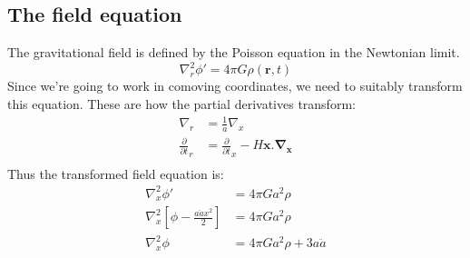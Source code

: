 \documentclass[12pt,a4paper,twoside]{book}
\begin{document}
		\subsection{The field equation}
			The gravitational field is defined by the Poisson equation in the Newtonian limit.
			\begin{equation}
			\nabla_r^2\phi'=4\pi G\rho(\mathbf{r},t)
			\end{equation}
			Since we're going to work in comoving coordinates, we need to suitably transform this equation. These are how the partial derivatives transform:
			\begin{equation}
				\begin{aligned}
					\nabla_r&=\frac{1}{a}\nabla_x\\
					\frac{\partial}{\partial t}_r&=\frac{\partial}{\partial t}_x-H\mathbf{x.\nabla_x}\\
				\end{aligned}
				\label{eq:transform}
			\end{equation}
			Thus the transformed field equation is:
			\begin{equation}
				\begin{aligned}
					\nabla^2_x\phi'&=4\pi Ga^2\rho\\
					\nabla^2_x\left[\phi-\frac{a\ddot{a}x^2}{2}\right]&=4\pi Ga^2\rho\\
					\nabla_x^2\phi&=4\pi Ga^2\rho+3a\ddot{a}\\
				\end{aligned}
				\label{eq:phi_x}
			\end{equation}
			
\end{document}
